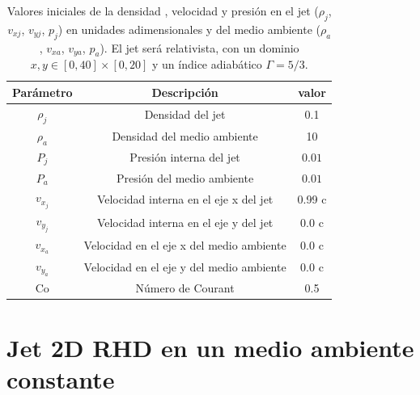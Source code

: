 \documentclass[12pt,a4paper]{book}
\begin{document}
\begin{table}[htbp]
\begin{center}
\begin{tabular}{|c|c|c|}
\hline 
\textbf{Parámetro} & \textbf{Descripción} & \textbf{valor} \\ 
\hline 
$\rho_{j}$ &  Densidad del jet & 0.1  \\ 
\hline 
$\rho_{a}$ &  Densidad del medio ambiente & 10   \\
\hline 
$P_{j}$ & Presión interna del jet& $0.01 $ \\ 
\hline 
$P_{a}$ &  Presión del medio ambiente & $0.01 $  \\ 
\hline 
$v_{x_{j}}$ & Velocidad interna en el eje x del jet & 0.99 c \\ 
\hline 
$v_{y_{j}}$ & Velocidad interna en el eje y del jet & 0.0 c \\ 
\hline 
$v_{x_{a}}$ & Velocidad en el eje x del medio ambiente & 0.0 c \\
\hline 
$v_{y_{a}}$ & Velocidad en el eje y del medio ambiente & 0.0 c \\ 
\hline 
Co & Número de Courant & 0.5 \\ 
\hline 
\end{tabular}
\caption{\label{Cuadro: propiedades-jet-comparacion} Valores iniciales de la densidad ,
velocidad  y presión  en el jet ($\rho_j$, $v_{xj}$, $v_{yj}$, $p_j$) en unidades adimensionales y 
del medio ambiente ($\rho_a$, $v_{xa}$, $v_{ya}$, $p_{a}$). El jet será relativista, con un dominio 
$x, y \in [0,40]\times[0,20]$ y un índice adiabático $\Gamma = 5/3$.}
\end{center}
\end{table}

\section{Jet 2D RHD en un medio ambiente constante} \label{sec:jet_ambiente_constante}
\end{document}
